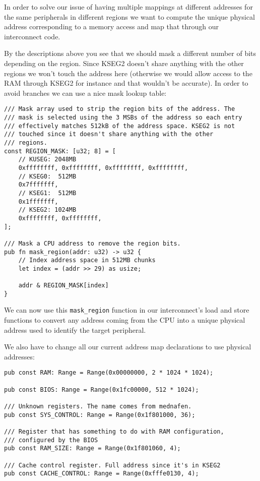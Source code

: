 \documentclass[a4paper]{article}
\newcommand{\code}[1] {\texttt{#1}}
\begin{document}
In order to solve our issue of having multiple mappings at different
addresses for the same peripherals in different regions we want to
compute the unique physical address corresponding to a memory access
and map that through our interconnect code.

By the descriptions above you see that we should mask a different
number of bits depending on the region. Since KSEG2 doesn't share
anything with the other regions we won't touch the address here
(otherwise we would allow access to the RAM through KSEG2 for instance
and that wouldn't be accurate). In order to avoid branches we can use
a nice mask lookup table:

\begin{lstlisting}
/// Mask array used to strip the region bits of the address. The
/// mask is selected using the 3 MSBs of the address so each entry
/// effectively matches 512kB of the address space. KSEG2 is not
/// touched since it doesn't share anything with the other
/// regions.
const REGION_MASK: [u32; 8] = [
    // KUSEG: 2048MB
    0xffffffff, 0xffffffff, 0xffffffff, 0xffffffff,
    // KSEG0:  512MB
    0x7fffffff,
    // KSEG1:  512MB
    0x1fffffff,
    // KSEG2: 1024MB
    0xffffffff, 0xffffffff,
];

/// Mask a CPU address to remove the region bits.
pub fn mask_region(addr: u32) -> u32 {
    // Index address space in 512MB chunks
    let index = (addr >> 29) as usize;

    addr & REGION_MASK[index]
}
\end{lstlisting}

We can now use this \code{mask\_region} function in our interconnect's
load and store functions to convert any address coming from the CPU
into a unique physical address used to identify the target peripheral.

We also have to change all our current address map declarations to use
physical addresses:

\begin{lstlisting}
pub const RAM: Range = Range(0x00000000, 2 * 1024 * 1024);

pub const BIOS: Range = Range(0x1fc00000, 512 * 1024);

/// Unknown registers. The name comes from mednafen.
pub const SYS_CONTROL: Range = Range(0x1f801000, 36);

/// Register that has something to do with RAM configuration,
/// configured by the BIOS
pub const RAM_SIZE: Range = Range(0x1f801060, 4);

/// Cache control register. Full address since it's in KSEG2
pub const CACHE_CONTROL: Range = Range(0xfffe0130, 4);
\end{lstlisting}
\end{document}
